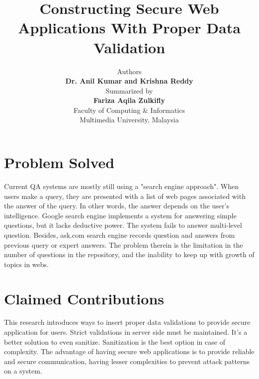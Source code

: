 \documentclass[a4paper,12pt]{article}
\begin{document}
\title{\textbf{Constructing Secure Web Applications With Proper Data Validation}}
\date{}
\author{
Authors\\
\textbf{Dr. Anil Kumar and Krishna Reddy}\\
Summarized by\\
\textbf{Fariza Aqila Zulkifly}\\
Faculty of Computing \& Informatics\\
Multimedia University, Malaysia}
\maketitle
\section{Problem Solved}
Current QA systems are mostly still using a "search engine approach". When users make a query, they are presented with a list of web pages associated with the answer of the query. In other words, the answer depends on the user’s intelligence. Google search engine implements a system for answering simple questions, but it lacks deductive power. The system fails to answer multi-level question. Besides, ask.com search engine records question and answers from previous query or expert answers. The problem therein is the limitation in the number of questions in the repository, and the inability to keep up with growth of topics in webs.
\section{Claimed Contributions}
This research introduces ways to insert proper data validations to provide secure application for users. Strict validations in server side must be maintained. It’s a better solution to even sanitize. Sanitization is the best option in case of complexity. The advantage of having secure web applications is to provide reliable and secure communication, having lesser complexities to prevent attack patterns on a system.
\end{document}
